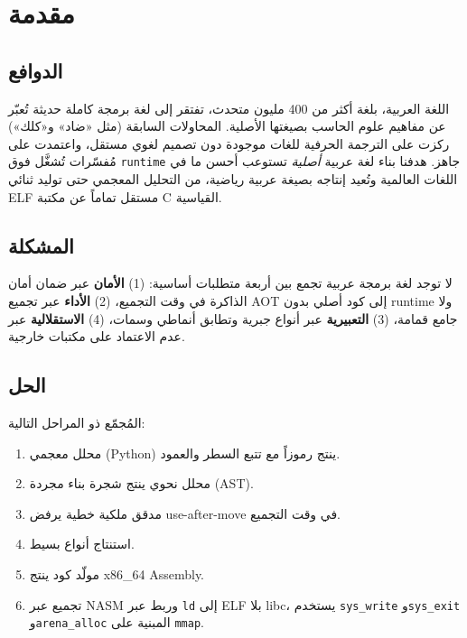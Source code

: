 \documentclass[sigconf]{acmart}
\begin{document}

\maketitle

\section{مقدمة}
\label{sec:intro}

\subsection{الدوافع}
\label{sec:intro:motivation}

اللغة العربية، بلغة أكثر من 400 مليون متحدث، تفتقر إلى لغة برمجة كاملة حديثة
تُعبّر عن مفاهيم علوم الحاسب بصيغتها الأصلية. المحاولات السابقة (مثل «ضاد»
و«كلك») ركزت على الترجمة الحرفية للغات موجودة دون تصميم لغوي مستقل، واعتمدت على
مُفسّرات تُشغَّل فوق \texttt{runtime} جاهز. هدفنا بناء لغة عربية \emph{أصلية}
تستوعب أحسن ما في اللغات العالمية وتُعيد إنتاجه بصيغة عربية رياضية، من التحليل
المعجمي حتى توليد ثنائي ELF مستقل تماماً عن مكتبة C القياسية.

\subsection{المشكلة}
\label{sec:intro:problem}

لا توجد لغة برمجة عربية تجمع بين أربعة متطلبات أساسية: (1) \textbf{الأمان} عبر
ضمان أمان الذاكرة في وقت التجميع، (2) \textbf{الأداء} عبر تجميع AOT إلى كود
أصلي بدون runtime ولا جامع قمامة، (3) \textbf{التعبيرية} عبر أنواع جبرية وتطابق
أنماطي وسمات، (4) \textbf{الاستقلالية} عبر عدم الاعتماد على مكتبات خارجية.

\subsection{الحل}
\label{sec:intro:solution}

المُجمّع ذو المراحل التالية:

\begin{enumerate}
\item محلل معجمي (Python) ينتج رموزاً مع تتبع السطر والعمود.
\item محلل نحوي ينتج شجرة بناء مجردة (AST).
\item مدقق ملكية خطية يرفض use-after-move في وقت التجميع.
\item استنتاج أنواع بسيط.
\item مولّد كود ينتج x86\_64 Assembly.
\item تجميع عبر NASM وربط عبر \texttt{ld} إلى ELF بلا libc، يستخدم
  \texttt{sys\_write} و\texttt{sys\_exit} و\texttt{arena\_alloc} المبنية على
  \texttt{mmap}.
\end{enumerate}
\end{document}
